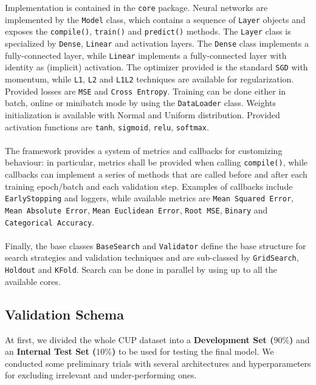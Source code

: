 Implementation is contained in the \texttt{core} package. Neural networks are implemented by the \texttt{Model} class, which contains a sequence of \texttt{Layer} objects and exposes the \texttt{compile()}, \texttt{train()} and \texttt{predict()} methods. The \texttt{Layer} class is specialized by \texttt{Dense}, \texttt{Linear} and activation layers. The \texttt{Dense} class implements a fully-connected layer, while \texttt{Linear} implements a fully-connected layer with identity as (implicit) activation.
The optimizer provided is the standard \texttt{SGD} with momentum, while \texttt{L1}, \texttt{L2} and \texttt{L1L2} techniques are available for regularization. Provided losses are \texttt{MSE} and \texttt{Cross Entropy}. Training can be done either in batch, online or minibatch mode by using the \texttt{DataLoader} class. Weights initialization is available with Normal and Uniform distribution. Provided activation functions are \texttt{tanh}, \texttt{sigmoid}, \texttt{relu}, \texttt{softmax}.

\paragraph{}

The framework provides a system of metrics and callbacks for customizing behaviour: in particular, metrics shall be provided when calling \texttt{compile()}, while callbacks can implement a series of methods that are called before and after each training epoch/batch and each validation step. Examples of callbacks include \texttt{EarlyStopping} and loggers, while available metrics are \texttt{Mean Squared Error}, \texttt{Mean Absolute Error}, \texttt{Mean Euclidean Error}, \texttt{Root MSE}, \texttt{Binary} and \texttt{Categorical Accuracy}.

\paragraph{}

Finally, the base classes \texttt{BaseSearch} and \texttt{Validator} define the base structure for search strategies and validation techniques and are sub-classed by \texttt{GridSearch}, \texttt{Holdout} and \texttt{KFold}. Search can be done in parallel by using up to all the available cores.

\subsection{Validation Schema}
At first, we divided the whole CUP dataset into a \textbf{Development Set ($90\%$)} and an \textbf{Internal Test Set ($10\%$)} to be used for testing the final model. We conducted some preliminary trials with several architectures and hyperparameters for excluding irrelevant and under-performing ones.

